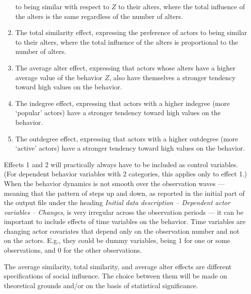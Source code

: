 \documentclass[a4paper,fleqn,11pt]{article}
\newcommand{\+}{\, + \,}
\begin{document}
\begin{enumerate}
      to being similar with respect to $Z$ to their alters,
      where the total influence of the alters is the same
      regardless of the number of alters.
\item The total similarity effect, expressing the preference of actors
      to being similar to their alters,
      where the total influence of the alters is proportional to
      the number of alters.
\item The average alter effect, expressing that actors
      whose alters have a higher average value of the behavior $Z$,
      also have themselves a stronger tendency toward high values on the behavior.
\item The indegree effect, expressing that actors with a higher indegree
      (more `popular' actors) have a stronger tendency toward high values on the behavior.
\item The outdegree effect, expressing that actors with a higher outdegree
      (more `active' actors) have a stronger tendency toward high values on the behavior.
\end{enumerate}
Effects 1 and 2 will practically always have to be included as control variables.
(For dependent behavior variables with 2 categories, this applies only to effect 1.)
When the behavior dynamics is not smooth over the observation waves --- meaning that
the pattern of steps up and down, as reported in the initial part of the output
file under the heading \emph{Initial data description -- Dependent actor variables -- Changes},
is very irregular across the observation periods --- it can be important to include
effects of time variables on the behavior.
Time variables are changing actor covariates that depend only on the
observation number and not on the actors. E.g., they could be dummy variables, being 1
for one or some observations, and 0 for the other observations.

The average similarity, total similarity, and average alter effects
are different specifications of social influence.
The choice between them will be made on theoretical grounds
and/or on the basis of statistical significance.
\medskip
\end{document}
